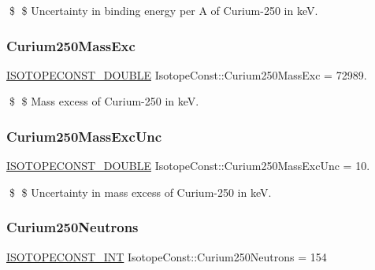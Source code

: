 \$ \$ Uncertainty in binding energy per A of Curium-\/250 in keV. \mbox{\label{group___isotope_const-_curium-_cm250_ga81a9ff4fc6b74bf0fa895f272c733291}} 
\subsubsection{\texorpdfstring{Curium250\+Mass\+Exc}{Curium250MassExc}}
{\footnotesize\ttfamily \mbox{\hyperlink{group___isotope_const-_macros_ga8f45a7272ce02c0b4c65c44636ed719a}{I\+S\+O\+T\+O\+P\+E\+C\+O\+N\+S\+T\+\_\+\+D\+O\+U\+B\+LE}} Isotope\+Const\+::\+Curium250\+Mass\+Exc = 72989.}

\$ \$ Mass excess of Curium-\/250 in keV. \mbox{\label{group___isotope_const-_curium-_cm250_ga3add2abf666a5abf90b5775b530b7dd1}} 
\subsubsection{\texorpdfstring{Curium250\+Mass\+Exc\+Unc}{Curium250MassExcUnc}}
{\footnotesize\ttfamily \mbox{\hyperlink{group___isotope_const-_macros_ga8f45a7272ce02c0b4c65c44636ed719a}{I\+S\+O\+T\+O\+P\+E\+C\+O\+N\+S\+T\+\_\+\+D\+O\+U\+B\+LE}} Isotope\+Const\+::\+Curium250\+Mass\+Exc\+Unc = 10.}

\$ \$ Uncertainty in mass excess of Curium-\/250 in keV. \mbox{\label{group___isotope_const-_curium-_cm250_gacc213e00477ea090270423b98a597d23}} 
\subsubsection{\texorpdfstring{Curium250\+Neutrons}{Curium250Neutrons}}
{\footnotesize\ttfamily \mbox{\hyperlink{group___isotope_const-_macros_ga5f18360b3e99483a35c32d789e62621c}{I\+S\+O\+T\+O\+P\+E\+C\+O\+N\+S\+T\+\_\+\+I\+NT}} Isotope\+Const\+::\+Curium250\+Neutrons = 154}

